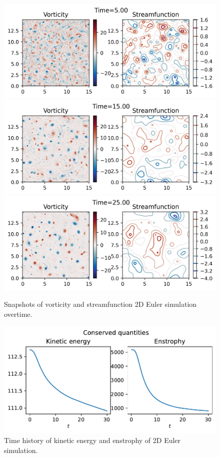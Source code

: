 \begin{figure}
    \centering
    \includegraphics{2DEuler_zeta_t5d00}
    \includegraphics{2DEuler_zeta_t15d00}
    \includegraphics{2DEuler_zeta_t25d00}
    \caption{Snapshots of vorticity and streamfunction 2D Euler simulation overtime.}
    \label{fig:2DEuler_zeta_t}
\end{figure}

\begin{figure}
    \centering
    \includegraphics{2DEuler_energy}
    \caption{Time history of kinetic energy and enstrophy of 2D Euler simulation.}
    \label{fig:2DEuler_energy}
\end{figure}

